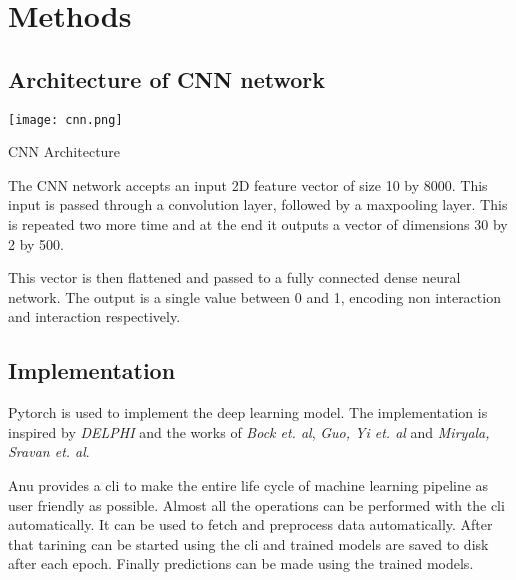 \documentclass[../main.tex]{subfiles}
\begin{document}
\section{Methods}

\subsection{Architecture of CNN network}
\texttt{[image: cnn.png]}\caption{CNN Architecture} 
The CNN network accepts an input 2D feature vector of size 10 by 8000.
This input is passed through a convolution layer, followed by a maxpooling layer.
This is repeated two more time and at the end it outputs a vector of dimensions 30 by 2 by 500.

This vector is then flattened and passed to a fully connected dense neural network.
The output is a single value between 0 and 1, encoding non interaction and interaction respectively.

\subsection{Implementation}
Pytorch is used to implement the deep learning model.
The implementation is inspired by \emph{DELPHI}
and the works of \emph{Bock et. al}, \emph{Guo, Yi et. al}
and \emph{Miryala, Sravan et. al}.

Anu provides a cli to make the entire life cycle of machine learning pipeline as user friendly as possible.
Almost all the operations can be performed with the cli automatically.
It can be used to fetch and preprocess data automatically.
After that tarining can be started using the cli and trained models are saved to disk after each epoch.
Finally predictions can be made using the trained models.
\end{document}
